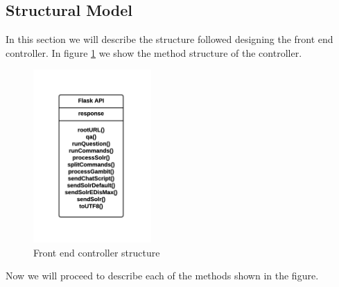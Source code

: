 
\subsection{Structural Model}

In this section we will describe the structure followed designing the front end controller. In figure \ref{fig:fe-methods1} we show the method structure of the controller.
\begin{figure}[!htbp]
    \centering
    \includegraphics[width=0.4\textwidth]{img/prot/controllerStructure.png}
    \caption{Front end controller structure}
    \label{fig:fe-methods1}
\end{figure}

Now we will proceed to describe each of the methods shown in the figure.

